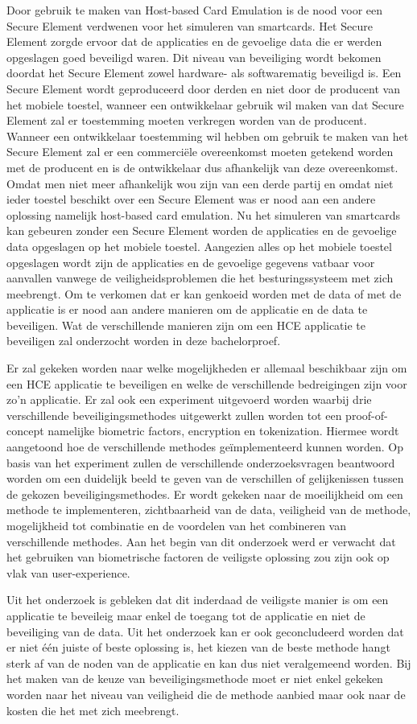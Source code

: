 Door gebruik te maken van Host-based Card Emulation is de nood voor een Secure Element verdwenen voor het simuleren van smartcards. Het Secure Element zorgde ervoor dat de applicaties en de gevoelige data die er werden opgeslagen goed beveiligd waren. Dit niveau van beveiliging wordt bekomen doordat het Secure Element zowel hardware- als softwarematig beveiligd is. Een Secure Element wordt geproduceerd door derden en niet door de producent van het mobiele toestel, wanneer een ontwikkelaar gebruik wil maken van dat Secure Element zal er toestemming moeten verkregen worden van de producent. Wanneer een ontwikkelaar toestemming wil hebben om gebruik te maken van het Secure Element zal er een commerciële overeenkomst moeten getekend worden met de producent en is de ontwikkelaar dus afhankelijk van deze overeenkomst. Omdat men niet meer afhankelijk wou zijn van een derde partij en omdat niet ieder toestel beschikt over een Secure Element was er nood aan een andere oplossing namelijk host-based card emulation. Nu het simuleren van smartcards kan gebeuren zonder een Secure Element worden de applicaties en de gevoelige data opgeslagen op het mobiele toestel. Aangezien alles op het mobiele toestel opgeslagen wordt zijn de applicaties en de gevoelige gegevens vatbaar voor aanvallen vanwege de veiligheidsproblemen die het besturingssysteem met zich meebrengt. Om te verkomen dat er kan genkoeid worden met de data of met de applicatie is er nood aan andere manieren om de applicatie en de data te beveiligen. Wat de verschillende manieren zijn om een HCE applicatie te beveiligen zal onderzocht worden in deze bachelorproef. 

Er zal gekeken worden naar welke mogelijkheden er allemaal beschikbaar zijn om een HCE applicatie te beveiligen en welke de verschillende bedreigingen zijn voor zo'n applicatie. Er zal ook een experiment uitgevoerd worden waarbij drie verschillende beveiligingsmethodes uitgewerkt zullen worden tot een proof-of-concept namelijke biometric factors, encryption en tokenization. Hiermee wordt aangetoond hoe de verschillende methodes geïmplementeerd kunnen worden. Op basis van het experiment zullen de verschillende onderzoeksvragen beantwoord worden om een duidelijk beeld te geven van de verschillen of gelijkenissen tussen de gekozen beveiligingsmethodes. Er wordt gekeken naar de moeilijkheid om een methode te implementeren,  zichtbaarheid van de data, veiligheid van de methode, mogelijkheid tot combinatie en de voordelen van het combineren van verschillende methodes. Aan het begin van dit onderzoek werd er verwacht dat het gebruiken van biometrische factoren de veiligste oplossing zou zijn ook op vlak van user-experience.

 Uit het onderzoek is gebleken dat dit inderdaad de veiligste manier is om een applicatie te beveileig maar enkel de toegang tot de applicatie en niet de beveiliging van de data. Uit het onderzoek kan er ook geconcludeerd worden dat er niet één juiste of beste oplossing is, het kiezen van de beste methode hangt sterk af van de noden van de applicatie en kan dus niet veralgemeend worden. Bij het maken van de keuze van beveiligingsmethode moet er niet enkel gekeken worden naar het niveau van veiligheid die de methode aanbied maar ook naar de kosten die het met zich meebrengt. 